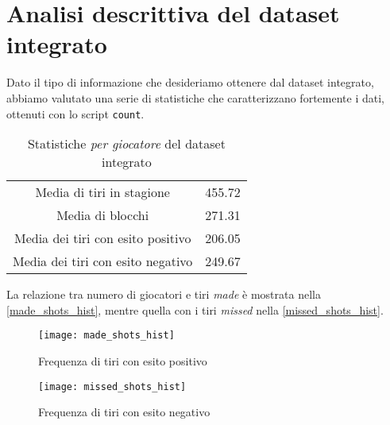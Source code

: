 \pagebreak
\section{Analisi descrittiva del dataset integrato}

Dato il tipo di informazione che desideriamo ottenere dal dataset integrato, abbiamo valutato una serie di statistiche che caratterizzano fortemente i dati, ottenuti con lo script \texttt{count}.

\begin{table}[h!]
\centering
	\begin{tabular}{c c} 
	 
		Media di tiri in stagione& 455.72 \\
		Media di blocchi& 271.31 \\
		Media dei tiri con esito positivo& 206.05\\
		Media dei tiri con esito negativo& 249.67\\
		\end{tabular}
		\caption{Statistiche \textit{per giocatore} del dataset integrato}
\end{table}

La relazione tra numero di giocatori e tiri \textit{made} è mostrata nella \autoref{made_shots_hist}, mentre quella con i tiri \textit{missed} nella \autoref{missed_shots_hist}.

\begin{figure}
\caption{Frequenza di tiri con esito positivo}
\label{made_shots_hist}
\texttt{[image: made\_shots\_hist]}
\end{figure}

\begin{figure}
\caption{Frequenza di tiri con esito negativo}
\label{missed_shots_hist}
\texttt{[image: missed\_shots\_hist]}
\end{figure}
